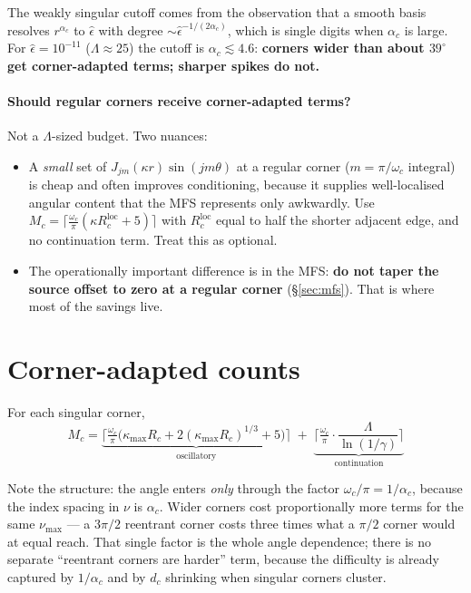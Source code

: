 \documentclass[11pt]{article}
\begin{document}
The weakly singular cutoff comes from the observation that a smooth basis resolves
$r^{\alpha_c}$ to $\hat\epsilon$ with degree $\sim\hat\epsilon^{-1/(2\alpha_c)}$,
which is single digits when $\alpha_c$ is large. For $\hat\epsilon=10^{-11}$
($\Lambda\approx25$) the cutoff is $\alpha_c\lesssim4.6$: \textbf{corners wider than
about $39^\circ$ get corner-adapted terms; sharper spikes do not.}

\paragraph{Should regular corners receive corner-adapted terms?}
Not a $\Lambda$-sized budget. Two nuances:

\begin{itemize}[leftmargin=1.4em]
\item A \emph{small} set of $J_{jm}(\kappa r)\sin(jm\theta)$ at a regular corner
  ($m=\pi/\omega_c$ integral) is cheap and often improves conditioning, because it
  supplies well-localised angular content that the MFS represents only awkwardly. Use
  $M_c=\lceil \tfrac{\omega_c}{\pi}(\kappa R_c^{\mathrm{loc}}+5)\rceil$ with
  $R_c^{\mathrm{loc}}$ equal to half the shorter adjacent edge, and no continuation
  term. Treat this as optional.
\item The operationally important difference is in the MFS: \textbf{do not taper the
  source offset to zero at a regular corner} (\S\ref{sec:mfs}). That is where most of
  the savings live.
\end{itemize}

\section{Corner-adapted counts}
\label{sec:corner}

For each singular corner,
\begin{equation}
  \boxed{\;
  M_c=
  \underbrace{\Big\lceil \tfrac{\omega_c}{\pi}
    \big(\kappa_{\max}R_c+2(\kappa_{\max}R_c)^{1/3}+5\big)\Big\rceil}_{\text{oscillatory}}
  \;+\;
  \underbrace{\Big\lceil \tfrac{\omega_c}{\pi}\cdot
    \frac{\Lambda}{\ln(1/\gamma)}\Big\rceil}_{\text{continuation}}
  \;}
  \label{eq:Mc}
\end{equation}

Note the structure: the angle enters \emph{only} through the factor
$\omega_c/\pi=1/\alpha_c$, because the index spacing in $\nu$ is $\alpha_c$. Wider
corners cost proportionally more terms for the same $\nu_{\max}$ --- a $3\pi/2$
reentrant corner costs three times what a $\pi/2$ corner would at equal reach. That
single factor is the whole angle dependence; there is no separate ``reentrant corners
are harder'' term, because the difficulty is already captured by $1/\alpha_c$ and by
$d_c$ shrinking when singular corners cluster.
\end{document}
